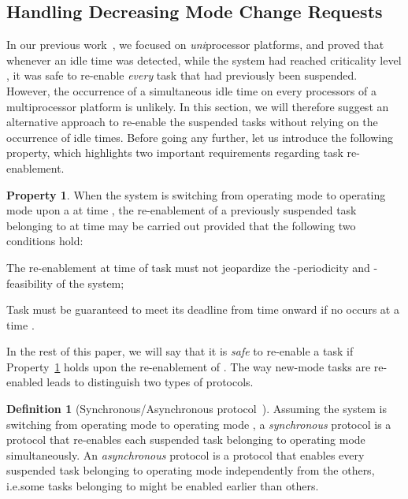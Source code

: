 \documentclass[10pt, conference, compsocconf, final]{IEEEtran}
\theoremstyle{definition}
\newtheorem{property}{Property}
\newtheorem{definition}{Definition}
\begin{document}
{\subsection{Handling Decreasing Mode Change Requests}\label{subsec:decreasing}
In our previous work~\cite{Santy:2012:RMS:2354411.2355225}, we focused on \emph{uni}processor platforms, and proved that whenever an idle time was detected, while the system had reached criticality level , it was safe to re-enable \emph{every} task that had previously been suspended. However, the occurrence of a simultaneous idle time on every processors of a multiprocessor platform is unlikely. In this section, we will therefore suggest an alternative approach to re-enable the suspended tasks without relying on the occurrence of idle times. Before going any further, let us introduce the following property, which highlights two important requirements regarding task re-enablement. \\
\begin{property}\label{prop:dmcr:safe}
When the system is switching from operating mode  to operating mode  upon a  at time , the re-enablement of a previously suspended task  belonging to  at time  may be carried out provided that the following two conditions hold:
\begin{compactitem}
	\item[] The re-enablement at time  of task  must not jeopardize the -periodicity and -feasibility of the system;
	\item[] Task  must be guaranteed to meet its deadline from time  onward if no  occurs at a time .
\end{compactitem}
\end{property}
In the rest of this paper, we will say that it is \emph{safe} to re-enable a task  if Property~\ref{prop:dmcr:safe} holds upon the re-enablement of . The way new-mode tasks are re-enabled leads to distinguish two types of protocols.
\begin{definition}[Synchronous/Asynchronous protocol~\cite{Real:2004:MCP:969960.969963}]\label{def:sync:async}
Assuming the system is switching from operating mode  to operating mode , a \emph{synchronous} protocol is a protocol that re-enables each suspended task belonging to operating mode  simultaneously. An \emph{asynchronous} protocol is a protocol that enables every suspended task belonging to operating mode  independently from the others, i.e.\@ some tasks belonging to  might be enabled earlier than others.
\end{definition}
\begin{figure}

\end{figure}}
\end{document}
